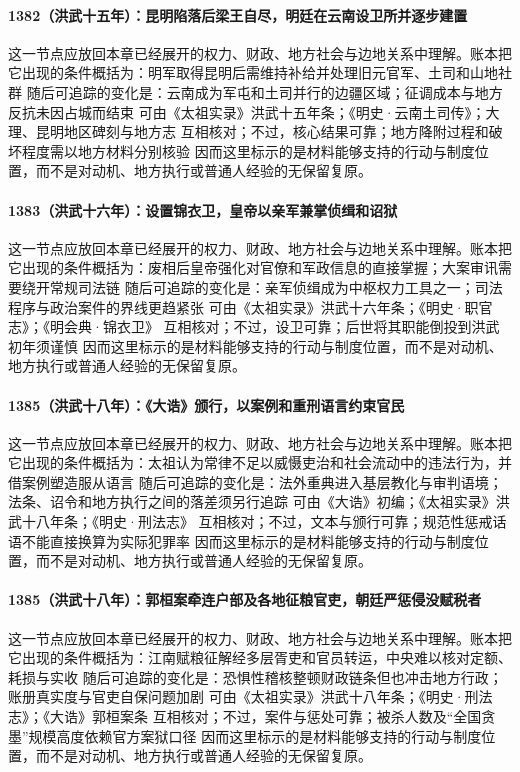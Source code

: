 \paragraph{1382（洪武十五年）：昆明陷落后梁王自尽，明廷在云南设卫所并逐步建置} 这一节点应放回本章已经展开的权力、财政、地方社会与边地关系中理解。账本把它出现的条件概括为：明军取得昆明后需维持补给并处理旧元官军、土司和山地社群 随后可追踪的变化是：云南成为军屯和土司并行的边疆区域；征调成本与地方反抗未因占城而结束 可由《太祖实录》洪武十五年条；《明史·云南土司传》；大理、昆明地区碑刻与地方志 互相核对；不过，核心结果可靠；地方降附过程和破坏程度需以地方材料分别核验 因而这里标示的是材料能够支持的行动与制度位置，而不是对动机、地方执行或普通人经验的无保留复原。

\paragraph{1383（洪武十六年）：设置锦衣卫，皇帝以亲军兼掌侦缉和诏狱} 这一节点应放回本章已经展开的权力、财政、地方社会与边地关系中理解。账本把它出现的条件概括为：废相后皇帝强化对官僚和军政信息的直接掌握；大案审讯需要绕开常规司法链 随后可追踪的变化是：亲军侦缉成为中枢权力工具之一；司法程序与政治案件的界线更趋紧张 可由《太祖实录》洪武十六年条；《明史·职官志》；《明会典·锦衣卫》 互相核对；不过，设卫可靠；后世将其职能倒投到洪武初年须谨慎 因而这里标示的是材料能够支持的行动与制度位置，而不是对动机、地方执行或普通人经验的无保留复原。

\paragraph{1385（洪武十八年）：《大诰》颁行，以案例和重刑语言约束官民} 这一节点应放回本章已经展开的权力、财政、地方社会与边地关系中理解。账本把它出现的条件概括为：太祖认为常律不足以威慑吏治和社会流动中的违法行为，并借案例塑造服从语言 随后可追踪的变化是：法外重典进入基层教化与审判语境；法条、诏令和地方执行之间的落差须另行追踪 可由《大诰》初编；《太祖实录》洪武十八年条；《明史·刑法志》 互相核对；不过，文本与颁行可靠；规范性惩戒话语不能直接换算为实际犯罪率 因而这里标示的是材料能够支持的行动与制度位置，而不是对动机、地方执行或普通人经验的无保留复原。

\paragraph{1385（洪武十八年）：郭桓案牵连户部及各地征粮官吏，朝廷严惩侵没赋税者} 这一节点应放回本章已经展开的权力、财政、地方社会与边地关系中理解。账本把它出现的条件概括为：江南赋粮征解经多层胥吏和官员转运，中央难以核对定额、耗损与实收 随后可追踪的变化是：恐惧性稽核整顿财政链条但也冲击地方行政；账册真实度与官吏自保问题加剧 可由《太祖实录》洪武十八年条；《明史·刑法志》；《大诰》郭桓案条 互相核对；不过，案件与惩处可靠；被杀人数及“全国贪墨”规模高度依赖官方案狱口径 因而这里标示的是材料能够支持的行动与制度位置，而不是对动机、地方执行或普通人经验的无保留复原。

